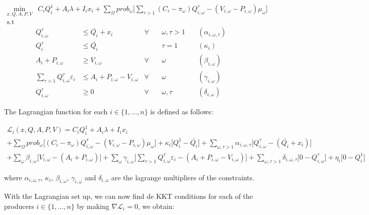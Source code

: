 \documentclass[11pt, letterpaper]{article}
\begin{document}
\begin{align}
    \min_{x,Q,A,P,V} & C_iQ_i^{1} + A_i \lambda + I_i x_i + \sum_{\Omega} prob_\omega \Big[ \sum_{\tau>1} (C_i-\pi_{\omega}) Q_{i,\omega}^{\tau}-(V_{i,\omega}-P_{i,\omega})\mu_{\omega}\Big]\\
     \textrm{s.t \ } \nonumber
\end{align}
\begin{align}
    Q_{i,\omega}^{\tau} & \leq \bar{Q_i} + x_i & \forall & \quad \omega, \tau  > 1 & \quad (\alpha_{i,\omega,\tau})\\
    Q_{i}^{\tau} & \leq \bar{Q_i}  &  & \quad \tau  =1 & \quad (\kappa_i) \\
 A_{i} + P_{i,\omega} & \geq  V_{i,\omega} & \forall & \quad \omega & \quad (\beta_{i,\omega})\\
 \sum_{\tau>1}Q_{i, \omega}^{\tau}\varepsilon_{i} & \leq  A_{i} + P_{i,\omega} - V_{i,\omega}  &\forall & \quad \omega & \quad (\gamma_{i,\omega})\\
 Q_{i, \omega}^{\tau} & \geq  0   & \forall & \quad \omega, \tau & \quad (\delta_{i,\omega})
\end{align}

The Lagrangian function for each $i \in \{ 1,...,n\}$ is defined as follows:

\begin{multline}
    \mathcal{L}_i(x,Q,A,P,V) = C_i Q_i^{1} + A_i \lambda + I_i x_i \\
    + \sum_{\Omega} prob_\omega \Big[(C_i-\pi_{\omega}) Q_{i,\omega}^{\tau} - (V_{i,\omega} - P_{i,\omega}) \mu_{\omega}\Big]+ \kappa_{i}\Big[Q_{i}^{1} - \bar{Q_i}\Big] +\sum_{\omega,\tau>1} \alpha_{i,\omega,\tau}\Big[Q_{i,\omega}^{\tau} - (\bar{Q_i}+ x_i)\Big] \\ + \sum_{\omega}\beta_{i,\omega}\Big[V_{i,\omega}-(A_i + P_{i,\omega})\Big] + \sum_{\omega}\gamma_{i,\omega} \Big[\sum_{\tau>1}Q_{i,\omega}^{\tau} \varepsilon_{i} - (A_i + P_{i,\omega} -V_{i,\omega})\Big] + \sum_{\omega, \tau>1}\delta_{i,\omega,\tau} \Big[0-Q_{i,\omega}^{\tau}\Big] + \eta_{i}\Big[0-Q^{1}_{i}\Big]
\end{multline}

where $\alpha_{i,\omega,\tau}$, $\kappa_i$, $\beta_{i,\omega}$, $\gamma_{i,\omega}$ and $\delta_{i,\omega}$ are the lagrange multipliers of the constraints. 

With the Lagrangian set up, we can now find de KKT conditions for each of the producers $i \in \{ 1,...,n\}$ by making $\nabla \mathcal{L}_{i}=0$, we obtain:
\end{document}

